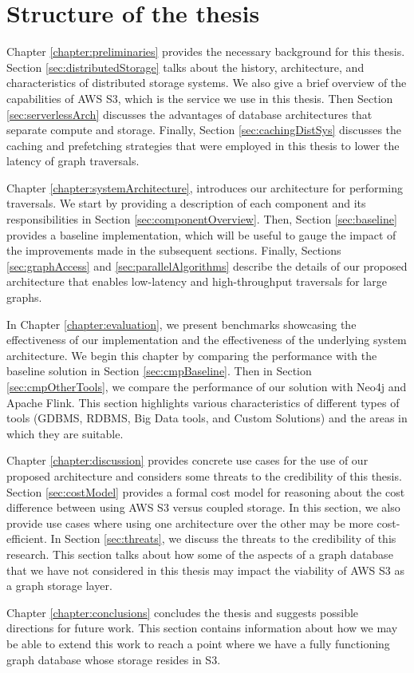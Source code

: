 \section{Structure of the thesis}

\medskip
Chapter \ref{chapter:preliminaries} provides the necessary background for
this thesis. Section \ref{sec:distributedStorage} talks about the
history, architecture, and characteristics of distributed storage systems. We
also give a brief overview of the capabilities of AWS S3, which is the service
we use in this thesis. Then
Section \ref{sec:serverlessArch} discusses the advantages of database
architectures that separate compute and storage. Finally, 
Section \ref{sec:cachingDistSys} discusses the caching and prefetching
strategies that were employed in this thesis to lower the latency of graph
traversals.

\medskip
Chapter \ref{chapter:systemArchitecture}, introduces our architecture for
performing traversals. We start by providing a description of each component and
its responsibilities in Section \ref{sec:componentOverview}. 
Then, Section \ref{sec:baseline} provides a baseline implementation, 
which will be useful to gauge
the impact of the improvements made in the subsequent sections. Finally, 
Sections \ref{sec:graphAccess} and \ref{sec:parallelAlgorithms} 
describe the details of our proposed architecture
that enables low-latency and high-throughput traversals for large graphs.

\medskip
In Chapter \ref{chapter:evaluation}, we present benchmarks showcasing the
effectiveness of our implementation and the effectiveness of the underlying 
system architecture. We begin this chapter by
comparing the performance with the baseline solution in
Section \ref{sec:cmpBaseline}. Then in Section \ref{sec:cmpOtherTools}, we
compare the performance of our solution with Neo4j and Apache Flink. This
section highlights various characteristics of different types of tools (GDBMS,
RDBMS, Big Data tools, and Custom Solutions) and the areas in which they 
are suitable. 

\medskip
Chapter \ref{chapter:discussion} provides concrete use cases for the use of our
proposed architecture and considers some threats to the credibility of this
thesis. Section \ref{sec:costModel} provides a formal cost model for reasoning
about the cost difference between using AWS S3 versus coupled storage. In this
section, we also provide use cases where using one architecture over the other
may be more cost-efficient. In Section \ref{sec:threats}, we discuss the threats
to the credibility of this research. This section talks about how some of the
aspects of a graph database that we have not considered in this thesis may
impact the viability of AWS S3 as a graph storage layer. 

\medskip
Chapter \ref{chapter:conclusions} concludes the thesis and
suggests possible directions for future work. This section contains information
about how we may be able to extend this work to reach a point where we have a
fully functioning graph database whose storage resides in S3.
